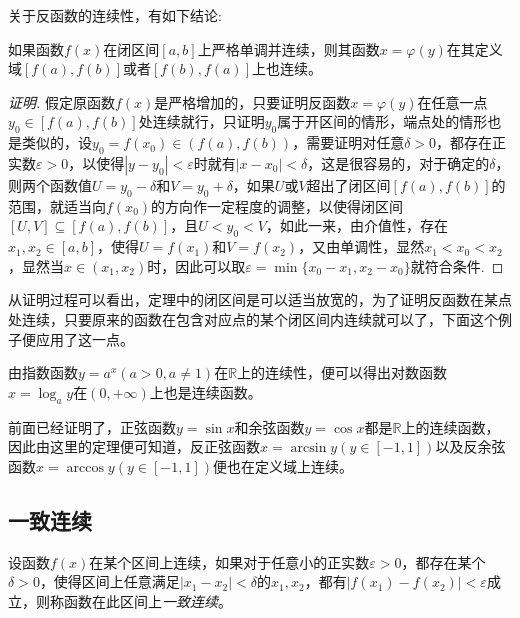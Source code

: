 关于反函数的连续性，有如下结论:
\begin{theorem}
  如果函数$f(x)$在闭区间$[a,b]$上严格单调并连续，则其函数$x=\varphi(y)$在其定义域$[f(a),f(b)]$或者$[f(b),f(a)]$上也连续。
\end{theorem}

\begin{proof}[证明]
  假定原函数$f(x)$是严格增加的，只要证明反函数$x=\varphi(y)$在任意一点$y_0 \in [f(a),f(b)]$处连续就行，只证明$y_0$属于开区间的情形，端点处的情形也是类似的，设$y_0=f(x_0) \in (f(a),f(b))$，需要证明对任意$\delta>0$，都存在正实数$\varepsilon>0$，以使得$|y-y_0|<\varepsilon$时就有$|x-x_0|<\delta$，这是很容易的，对于确定的$\delta$，则两个函数值$U=y_0-\delta$和$V=y_0+\delta$，如果$U$或$V$超出了闭区间$[f(a),f(b)]$的范围，就适当向$f(x_0)$的方向作一定程度的调整，以使得闭区间$[U,V] \subseteq [f(a),f(b)]$，且$U<y_0<V$，如此一来，由介值性，存在$x_1,x_2 \in [a,b]$，使得$U=f(x_1)$和$V=f(x_2)$，又由单调性，显然$x_1 < x_0 < x_2$，显然当$x \in (x_1,x_2)$时，因此可以取$\varepsilon = \min\{x_0-x_1,x_2-x_0\}$就符合条件.
\end{proof}

从证明过程可以看出，定理中的闭区间是可以适当放宽的，为了证明反函数在某点处连续，只要原来的函数在包含对应点的某个闭区间内连续就可以了，下面这个例子便应用了这一点。

\begin{example}
  由指数函数$y=a^x(a>0,a \neq 1)$在$\mathbb{R}$上的连续性，便可以得出对数函数$x=\log_a y$在$(0,+\infty)$上也是连续函数。
\end{example}

\begin{example}
  前面已经证明了，正弦函数$y=\sin{x}$和余弦函数$y=\cos{x}$都是$\mathbb{R}$上的连续函数，因此由这里的定理便可知道，反正弦函数$x=\arcsin{y}(y \in [-1,1])$以及反余弦函数$x=\arccos{y}(y \in [-1,1])$便也在定义域上连续。
\end{example}

\subsection{一致连续}
\label{sec:uniform-continuity}

\begin{definition}
  设函数$f(x)$在某个区间上连续，如果对于任意小的正实数$\varepsilon>0$，都存在某个$\delta>0$，使得区间上任意满足$|x_1-x_2|<\delta$的$x_1,x_2$，都有$|f(x_1)-f(x_2)|<\varepsilon$成立，则称函数在此区间上\emph{一致连续}。
\end{definition}

